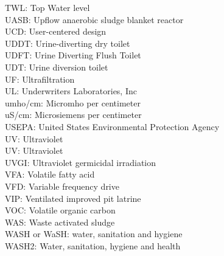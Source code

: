 TWL:  Top Water level
\vspace{0.3cm}\\
UASB:  Upflow anaerobic sludge blanket reactor
\vspace{0.3cm}\\
UCD:  User-centered design
\vspace{0.3cm}\\
UDDT:  Urine-diverting dry toilet
\vspace{0.3cm}\\
UDFT:  Urine Diverting Flush Toilet
\vspace{0.3cm}\\
UDT:  Urine diversion toilet
\vspace{0.3cm}\\
UF: Ultrafiltration
\vspace{0.3cm}\\
UL:  Underwriters Laboratories, Inc
\vspace{0.3cm}\\
umho/cm:  Micromho per centimeter
\vspace{0.3cm}\\
uS/cm:  Microsiemens per centimeter
\vspace{0.3cm}\\
USEPA:  United States Environmental Protection Agency
\vspace{0.3cm}\\
UV:  Ultraviolet
\vspace{0.3cm}\\
UV: Ultraviolet
\vspace{0.3cm}\\
UVGI:  Ultraviolet germicidal irradiation
\vspace{0.3cm}\\
VFA:  Volatile fatty acid
\vspace{0.3cm}\\
VFD:  Variable frequency drive
\vspace{0.3cm}\\
VIP:  Ventilated improved pit latrine
\vspace{0.3cm}\\
VOC:  Volatile organic carbon
\vspace{0.3cm}\\
WAS:  Waste activated sludge
\vspace{0.3cm}\\
WASH or WaSH:  water, sanitation and hygiene
\vspace{0.3cm}\\
WASH2:  Water, sanitation, hygiene and health
